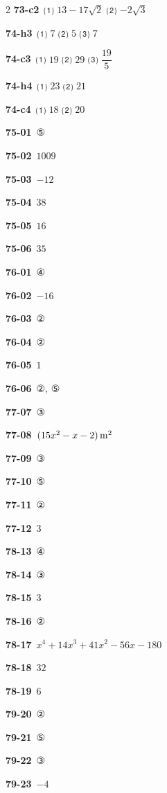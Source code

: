 \documentclass[10pt,a4paper]{article}
\begin{document}
\begin{multicols}{2}
\noindent\textbf{73-c2}\ ⑴ $13-17\sqrt{2}$ ⑵ $-2\sqrt{3}$\par
\noindent\textbf{74-h3}\ ⑴ $7$ ⑵ $5$ ⑶ $7$\par
\noindent\textbf{74-c3}\ ⑴ $19$ ⑵ $29$ ⑶ $\dfrac{19}{5}$\par
\noindent\textbf{74-h4}\ ⑴ $23$ ⑵ $21$\par
\noindent\textbf{74-c4}\ ⑴ $18$ ⑵ $20$\par
\noindent\textbf{75-01}\ ⑤\par
\noindent\textbf{75-02}\ $1009$\par
\noindent\textbf{75-03}\ $-12$\par
\noindent\textbf{75-04}\ $38$\par
\noindent\textbf{75-05}\ $16$\par
\noindent\textbf{75-06}\ $35$\par
\noindent\textbf{76-01}\ ④\par
\noindent\textbf{76-02}\ $-16$\par
\noindent\textbf{76-03}\ ②\par
\noindent\textbf{76-04}\ ②\par
\noindent\textbf{76-05}\ $1$\par
\noindent\textbf{76-06}\ ②, ⑤\par
\noindent\textbf{77-07}\ ③\par
\noindent\textbf{77-08}\ $(15x^2-x-2)\mkern3mu \mathrm{m}^2$\par
\noindent\textbf{77-09}\ ③\par
\noindent\textbf{77-10}\ ⑤\par
\noindent\textbf{77-11}\ ②\par
\noindent\textbf{77-12}\ $3$\par
\noindent\textbf{78-13}\ ④\par
\noindent\textbf{78-14}\ ③\par
\noindent\textbf{78-15}\ $3$\par
\noindent\textbf{78-16}\ ②\par
\noindent\textbf{78-17}\ $x^4+14x^3+41x^2-56x-180$\par
\noindent\textbf{78-18}\ $32$\par
\noindent\textbf{78-19}\ $6$\par
\noindent\textbf{79-20}\ ②\par
\noindent\textbf{79-21}\ ⑤\par
\noindent\textbf{79-22}\ ③\par
\noindent\textbf{79-23}\ $-4$\par

\end{multicols}
\end{document}
